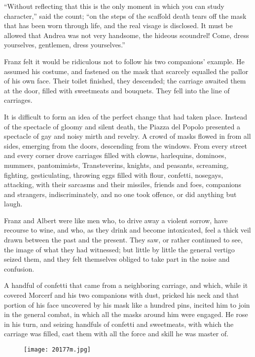 “Without reflecting that this is the only moment in which you can study
character,” said the count; “on the steps of the scaffold death tears
off the mask that has been worn through life, and the real visage is
disclosed. It must be allowed that Andrea was not very handsome, the
hideous scoundrel! Come, dress yourselves, gentlemen, dress
yourselves.”

Franz felt it would be ridiculous not to follow his two companions’
example. He assumed his costume, and fastened on the mask that scarcely
equalled the pallor of his own face. Their toilet finished, they
descended; the carriage awaited them at the door, filled with
sweetmeats and bouquets. They fell into the line of carriages.

It is difficult to form an idea of the perfect change that had taken
place. Instead of the spectacle of gloomy and silent death, the Piazza
del Popolo presented a spectacle of gay and noisy mirth and revelry. A
crowd of masks flowed in from all sides, emerging from the doors,
descending from the windows. From every street and every corner drove
carriages filled with clowns, harlequins, dominoes, mummers,
pantomimists, Transteverins, knights, and peasants, screaming,
fighting, gesticulating, throwing eggs filled with flour, confetti,
nosegays, attacking, with their sarcasms and their missiles, friends
and foes, companions and strangers, indiscriminately, and no one took
offence, or did anything but laugh.

Franz and Albert were like men who, to drive away a violent sorrow,
have recourse to wine, and who, as they drink and become intoxicated,
feel a thick veil drawn between the past and the present. They saw, or
rather continued to see, the image of what they had witnessed; but
little by little the general vertigo seized them, and they felt
themselves obliged to take part in the noise and confusion.

A handful of confetti that came from a neighboring carriage, and which,
while it covered Morcerf and his two companions with dust, pricked his
neck and that portion of his face uncovered by his mask like a hundred
pins, incited him to join in the general combat, in which all the masks
around him were engaged. He rose in his turn, and seizing handfuls of
confetti and sweetmeats, with which the carriage was filled, cast them
with all the force and skill he was master of.

\begin{figure}[ht]
\texttt{[image: 20177m.jpg]}
\end{figure}

